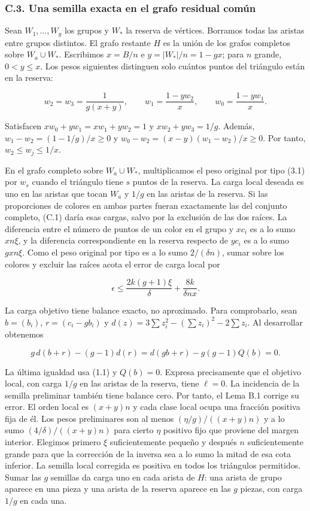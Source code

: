 \documentclass[spanish,11pt,a4paper]{article}
\begin{document}
\subsubsection{C.3. Una semilla exacta en el grafo residual común}\label{c.3.-una-semilla-exacta-en-el-grafo-residual-comuxfan}

Sean \(W_1,\ldots,W_g\) los grupos y \(W_\ast\) la reserva de vértices. Borramos todas las aristas entre grupos distintos. El grafo restante \(H\) es la unión de los grafos completos sobre \(W_a\cup W_\ast\). Escribimos \(x=B/n\) e \(y=|W_\ast|/n=1-gx\); para \(n\) grande, \(0<y\le x\). Los pesos siguientes distinguen solo cuántos puntos del triángulo están en la reserva:

\[w_2=w_3=\frac1{g(x+y)},\qquad w_1=\frac{1-yw_2}{x},\qquad w_0=\frac{1-yw_1}{x}.\tag{C.1}\]

Satisfacen \(xw_0+yw_1=xw_1+yw_2=1\) y \(xw_2+yw_3=1/g\). Además, \(w_1-w_2=(1-1/g)/x\ge0\) y \(w_0-w_2=(x-y)(w_1-w_2)/x\ge0\). Por tanto, \(w_2\le w_j\le1/x\).

En el grafo completo sobre \(W_a\cup W_\ast\), multiplicamos el peso original por tipo (3.1) por \(w_s\) cuando el triángulo tiene \(s\) puntos de la reserva. La carga local deseada es uno en las aristas que tocan \(W_a\) y \(1/g\) en las aristas de la reserva. Si las proporciones de colores en ambas partes fueran exactamente las del conjunto completo, (C.1) daría esas cargas, salvo por la exclusión de las dos raíces. La diferencia entre el número de puntos de un color en el grupo y \(xc_i\) es a lo sumo \(xn\xi\), y la diferencia correspondiente en la reserva respecto de \(yc_i\) es a lo sumo \(gxn\xi\). Como el peso original por tipo es a lo sumo \(2/(\delta n)\), sumar sobre los colores y excluir las raíces acota el error de carga local por

\[\epsilon\le\frac{2k(g+1)\xi}{\delta}+\frac{8k}{\delta nx}.\tag{C.2}\]

La carga objetivo tiene balance exacto, no aproximado. Para comprobarlo, sean \(b=(b_i)\), \(r=(c_i-gb_i)\) y \(d(z)=3\sum z_i^2-(\sum z_i)^2-2\sum z_i\). Al desarrollar obtenemos

\[g\,d(b+r)-(g-1)d(r)=d(gb+r)-g(g-1)Q(b)=0.\]

La última igualdad usa (1.1) y \(Q(b)=0\). Expresa precisamente que el objetivo local, con carga \(1/g\) en las aristas de la reserva, tiene \(\ell=0\). La incidencia de la semilla preliminar también tiene balance cero. Por tanto, el Lema B.1 corrige su error. El orden local es \((x+y)n\) y cada clase local ocupa una fracción positiva fija de él. Los pesos preliminares son al menos \((\eta/g)/((x+y)n)\) y a lo sumo \((4/\delta)/((x+y)n)\) para cierto \(\eta\) positivo fijo que proviene del margen interior. Elegimos primero \(\xi\) suficientemente pequeño y después \(n\) suficientemente grande para que la corrección de la inversa sea a lo sumo la mitad de esa cota inferior. La semilla local corregida es positiva en todos los triángulos permitidos. Sumar las \(g\) semillas da carga uno en cada arista de \(H\): una arista de grupo aparece en una pieza y una arista de la reserva aparece en las \(g\) piezas, con carga \(1/g\) en cada una.
\end{document}
